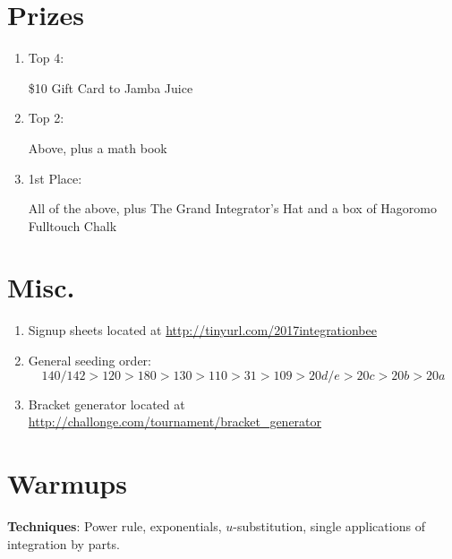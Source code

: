 \documentclass{article}
\begin{document}
\section{Prizes}

\begin{enumerate}
    \item Top 4:
    
    \$10 Gift Card to Jamba Juice
    
    \item Top 2:
    
    Above, plus a math book
    
    \item 1st Place:
    
    All of the above, plus The Grand Integrator's Hat and a box of Hagoromo Fulltouch Chalk
\end{enumerate}

\section{Misc.}
\begin{enumerate}
    
    \item Signup sheets located at \url{http://tinyurl.com/2017integrationbee}
    
    \item
    General seeding order:
    \[
    140/142 > 120 > 180 > 130 > 110 > 31 > 109 > 20d/e > 20c > 20b > 20a
    \]
    
    \item
    Bracket generator located at \url{http://challonge.com/tournament/bracket_generator}
    
\end{enumerate}




\section{Warmups}

\textbf{Techniques}: Power rule, exponentials, $u$-substitution, single applications of integration by parts.
\end{document}
